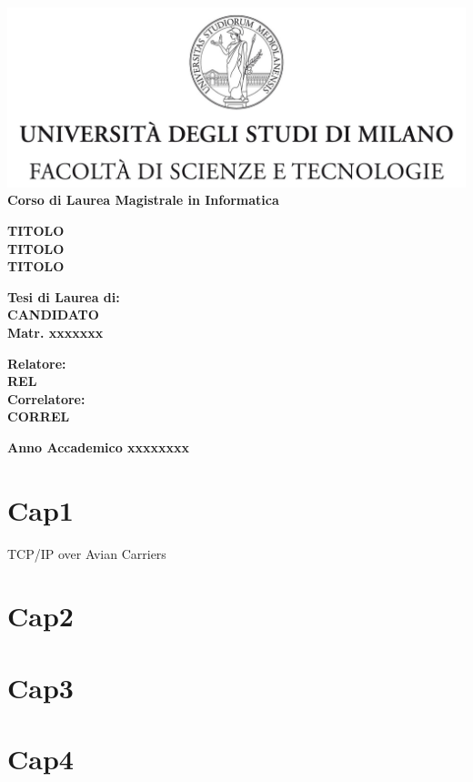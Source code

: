 \documentclass[a4paper]{report}
\begin{document}
\begin{titlepage}
\begin{center}
\includegraphics[width=\textwidth]{Logo.jpg}\\
{\large{\bf Corso di Laurea Magistrale in Informatica}}
\end{center}
\vspace{12mm}
\begin{center}
{\huge{\bf TITOLO}}\\
\vspace{4mm}
{\huge{\bf TITOLO}}\\
\vspace{4mm}
{\huge{\bf TITOLO}}\\
\end{center}
\vspace{12mm}
\begin{flushright}
{\large{\bf Tesi di Laurea di:}}\\
{\large{\bf CANDIDATO}}\\
{\large{\bf Matr. xxxxxxx}}\\
\end{flushright}
\vspace{4mm}
\begin{flushleft}
{\large{\bf Relatore:}}\\
{\large{\bf REL}}\\
\vspace{4mm}
{\large{\bf Correlatore:}}\\
{\large{\bf CORREL}}\\
\end{flushleft}
\vspace{12mm}
\begin{center}
{\large{\bf Anno Accademico xxxxxxxx}}
\end{center}
\end{titlepage}


\tableofcontents


\chapter{Cap1}

TCP/IP over Avian Carriers\cite{waitzman1990standard}

\chapter{Cap2}
\chapter{Cap3}
\chapter{Cap4}




\end{document}
